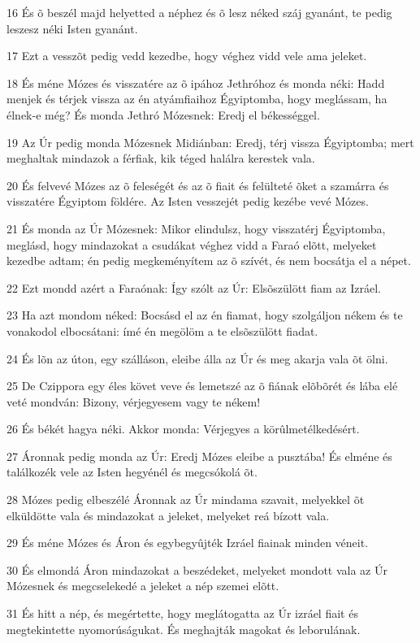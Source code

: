 \par 16 És õ beszél majd helyetted a néphez és õ lesz néked száj gyanánt, te pedig leszesz néki Isten gyanánt.
\par 17 Ezt a vesszõt pedig vedd kezedbe, hogy véghez vidd vele ama jeleket.
\par 18 És méne Mózes és visszatére az õ ipához Jethróhoz és monda néki: Hadd menjek és térjek vissza az én atyámfiaihoz Égyiptomba, hogy meglássam, ha élnek-e még? És monda Jethró Mózesnek: Eredj el békességgel.
\par 19 Az Úr pedig monda Mózesnek Midiánban: Eredj, térj vissza Égyiptomba; mert meghaltak mindazok a férfiak, kik téged halálra kerestek vala.
\par 20 És felvevé Mózes az õ feleségét és az õ fiait és felülteté õket a szamárra és visszatére Égyiptom földére. Az Isten vesszejét pedig kezébe vevé Mózes.
\par 21 És monda az Úr Mózesnek: Mikor elindulsz, hogy visszatérj Égyiptomba, meglásd, hogy mindazokat a csudákat véghez vidd a Faraó elõtt, melyeket kezedbe adtam; én pedig megkeményítem az õ szívét, és nem bocsátja el a népet.
\par 22 Ezt mondd azért a Faraónak: Így szólt az Úr: Elsõszülött fiam az Izráel.
\par 23 Ha azt mondom néked: Bocsásd el az én fiamat, hogy szolgáljon nékem és te vonakodol elbocsátani: ímé én megölöm a te elsõszülött fiadat.
\par 24 És lõn az úton, egy szálláson, eleibe álla az Úr és meg akarja vala õt ölni.
\par 25 De Czippora egy éles követ veve és lemetszé az õ fiának elõbõrét és lába elé veté mondván: Bizony, vérjegyesem vagy te nékem!
\par 26 És békét hagya néki. Akkor monda: Vérjegyes a körûlmetélkedésért.
\par 27 Áronnak pedig monda az Úr: Eredj Mózes eleibe a pusztába! És elméne és találkozék vele az Isten hegyénél és megcsókolá õt.
\par 28 Mózes pedig elbeszélé Áronnak az Úr mindama szavait, melyekkel õt elküldötte vala és mindazokat a jeleket, melyeket reá bízott vala.
\par 29 És méne Mózes és Áron és egybegyûjték Izráel fiainak minden véneit.
\par 30 És elmondá Áron mindazokat a beszédeket, melyeket mondott vala az Úr Mózesnek és megcselekedé a jeleket a nép szemei elõtt.
\par 31 És hitt a nép, és megértette, hogy meglátogatta az Úr izráel fiait és megtekintette nyomorúságukat. És meghajták magokat és leborulának.

